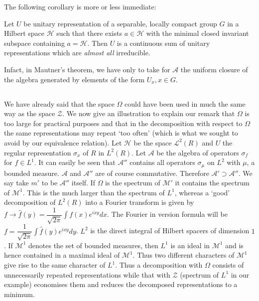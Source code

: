 The following corollary is more or less immediate:

\begin{coro*}
 Let $U$ be unitary representation of a separable, locally compact
 group $G$ in a Hilbert space $\mathscr{H}$ such that there exists $a \in
 \mathscr{H}$ with the minimal closed invariant subspace containing
 $a=\mathscr{H}$. Then $U$ is a continuous sum of unitary
 representations which are {\em almost all} irreducible. 
 \end{coro*}

In\pageoriginale fact, in Mautner's theorem, we have only to take for
$\mathcal{A}$ 
the uniform closure of the algebra generated by elements of the form
$U_x, x \in G$. 

\subsection{}\label{partIII-chap2-sec2.5}%

We have already said that the space $\Omega $ could have been  used in
much  the same way as the space $\mathcal{Z}$. We now give an
illustration to explain our remark that $\Omega$ is too large for
practical purposes and that in the decomposition with respect to
$\Omega$ the same representations may repeat `too often' (which is
what we sought to avoid by our equivalence relation). Let
$\mathscr{H}$ be the space $\mathscr{L}^2 (R)$ and $U$ the regular
representation $\sigma_x$ of $R$ in $L^2 (R)$. Let $\mathcal{A}$ be
the algebra of operators $\sigma_f$ for $f \in L ^1$. It can easily be
seen that $\mathcal{A}''$ contains all operators $\sigma_\mu$ on $L^2$
with $\mu$, a bounded measure. $\mathcal{A}$ and $\mathcal{A}''$ are of
course commutative. Therefore $\mathcal{A}' \supset \mathcal{A}''$. We
say take $m'$ to be $\mathcal{A}''$ itself. If $\Omega$ is the spectrum
of $\mathscr{M}'$ it contains the spectrum of $\mathscr{M}^1$.  This
is the much larger 
than the spectrum of $L^1$, whereas a `good' decomposition of $L^2(R)$
into a Fourier transform is given by $f \rightarrow \hat{f}
(y)=\dfrac{1}{\sqrt{2\pi}} \int f(x)e^{ixy} dx$. The Fourier in
version formula will be $f=\dfrac{1}{\sqrt{2\pi}} \int \hat{f}(y)
e^{ixy}dy$.  $L^2$ is the direct integral of Hilbert spacers of
dimension $1$. If $\mathscr{M}^1$ denotes the set of bounded measures, then $L^1$
is an ideal in $\mathscr{M}^1$ and is hence contained in a maximal ideal of
$\mathscr{M}^1$. Thus two different characters of $\mathscr{M}^1$ give
rise to the same 
character of $L^1$. Thus a decomposition with $\Omega$ consists of
unnecessarily repeated representations while that with $\mathcal{Z}$
(spectrum of $L^1$ in our example) economises them and reduces the
decomposed representations to a minimum. 

